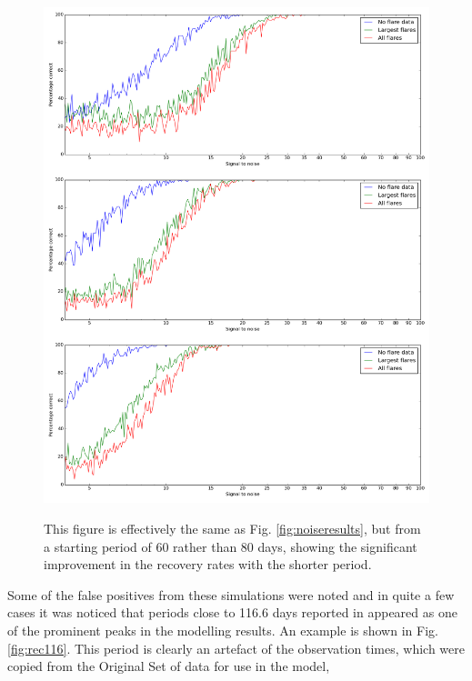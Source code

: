 \begin{figure}[!htbp]
\begin{center}
\includegraphics[scale=0.25]{Figures/Np60.png} \\
\end{center}
\caption{This figure is effectively the same as Fig. \ref{fig:noiseresults}, but from a starting period of 60 rather
  than 80 days, showing the significant improvement in the recovery rates with the shorter period.}
\protect\label{fig:noiseresults60}
\end{figure}

Some of the false positives from these simulations were noted and in quite a few cases it was noticed that periods close
to 116.6 days reported in \citet[Table 3]{suarezmascareno15} appeared as one of the prominent peaks in the modelling
results. An example is shown in Fig. \ref{fig:rec116}. This period is clearly an artefact of the observation times,
which were copied from the Original Set of {\harps} data for use in the model, 


